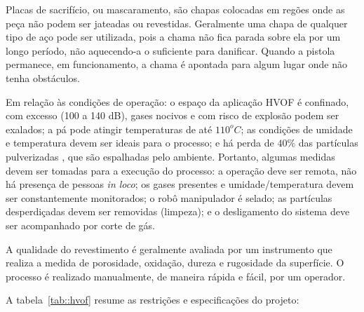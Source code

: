 Placas de sacrifício, ou mascaramento, são chapas colocadas em regões onde as
peça não podem ser jateadas ou revestidas. Geralmente uma chapa de qualquer tipo
de aço pode ser utilizada, pois a chama não fica parada sobre ela por um longo
período, não aquecendo-a o suficiente para danificar. Quando a pistola
permanece, em funcionamento, a chama é apontada para algum lugar onde não tenha obstáculos.

 

Em relação às condições de operação: o espaço da aplicação HVOF é confinado,
com excesso (100 a 140 dB), gases nocivos e com risco de explosão podem
ser exalados; a pá pode atingir temperaturas de até $110^oC$; as condições de
umidade e temperatura devem ser ideais para o processo; e há perda de $40\%$
das partículas pulverizadas  \citep{wu2006rebound}, que são espalhadas pelo
ambiente. Portanto, algumas medidas devem ser tomadas para a execução do
processo: a operação deve ser remota, não há presença de pessoas \textit{in
loco}; os gases presentes e umidade/temperatura devem ser constantemente
monitorados; o robô manipulador é selado; as partículas desperdiçadas devem
ser removidas (limpeza); e o desligamento do sistema deve ser acompanhado por corte de gás.

A qualidade do revestimento é geralmente avaliada por um instrumento que
realiza a medida de porosidade, oxidação, dureza e rugosidade da superfície. O
processo é realizado manualmente, de maneira rápida e fácil, por um operador.

A tabela~\ref{tab::hvof} resume as restrições e especificações do
projeto:

